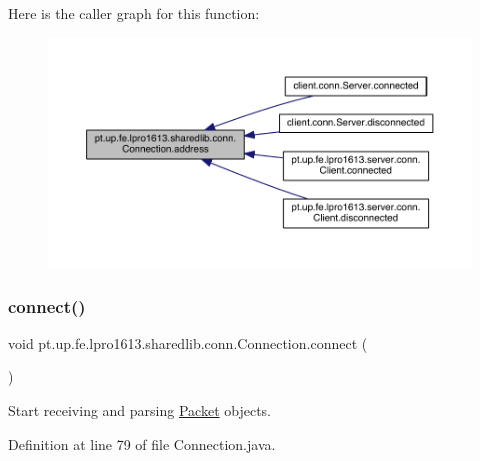 Here is the caller graph for this function\+:
\nopagebreak
\begin{figure}[H]
\begin{center}
\leavevmode
\includegraphics[width=350pt]{classpt_1_1up_1_1fe_1_1lpro1613_1_1sharedlib_1_1conn_1_1_connection_a58903a343693acbe946d4ad23eb29bd4_icgraph}
\end{center}
\end{figure}
\hypertarget{classpt_1_1up_1_1fe_1_1lpro1613_1_1sharedlib_1_1conn_1_1_connection_a8ccfed3defecf3a4070c32a0f3d6acb7}{}\label{classpt_1_1up_1_1fe_1_1lpro1613_1_1sharedlib_1_1conn_1_1_connection_a8ccfed3defecf3a4070c32a0f3d6acb7} 
\subsubsection{\texorpdfstring{connect()}{connect()}}
{\footnotesize\ttfamily void pt.\+up.\+fe.\+lpro1613.\+sharedlib.\+conn.\+Connection.\+connect (\begin{DoxyParamCaption}{ }\end{DoxyParamCaption})}

Start receiving and parsing \hyperlink{classpt_1_1up_1_1fe_1_1lpro1613_1_1sharedlib_1_1conn_1_1_packet}{Packet} objects. 

Definition at line 79 of file Connection.\+java.

